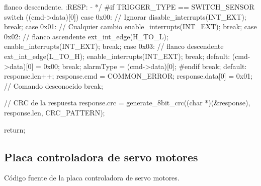 {\begin{verbatimtab}
{{			flanco descendente.
			:RESP:
			-
			*/
#if TRIGGER_TYPE == SWITCH_SENSOR
			switch ((cmd->data)[0])
			{
				case 0x00:
					// Ignorar
					disable_interrupts(INT_EXT);
					break;
				case 0x01:
					// Cualquier cambio
					enable_interrupts(INT_EXT);
					break;
				case 0x02:
					// flanco ascendente
					ext_int_edge(H_TO_L);
					enable_interrupts(INT_EXT);
					break;
				case 0x03:
					// flanco descendente
					ext_int_edge(L_TO_H);
					enable_interrupts(INT_EXT);
					break;
				default:
					(cmd->data)[0] = 0x00;
					break;
			}
			alarmType = (cmd->data)[0];
#endif
		break;
		default:
			response.len++;
			response.cmd = COMMON_ERROR;
			response.data[0] = 0x01; // Comando desconocido
		break;
	}	

	// CRC de la respuesta
	response.crc = generate_8bit_crc((char *)(&response), response.len, CRC_PATTERN);

	return;
}
\end{verbatimtab}
}

\subsection{Placa controladora de servo motores}
\label{hA_source_servo}

C\'odigo fuente de la placa controladora de servo motores.

